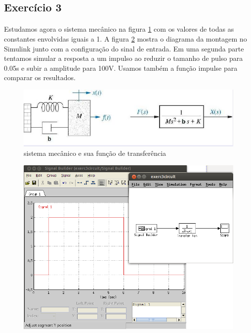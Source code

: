 \documentclass[a4paper,11pt]{article}
\begin{document}
\subsection{Exercício 3}
\paragraph{}Estudamos agora o sistema mecânico na figura
\ref{fig:exerc3-diagram} com os valores de todas as 
constantes envolvidas iguais a 1. A  figura \ref{fig:exerc3-matlab}
mostra o diagrama da montagem no Simulink junto com a configuração 
do sinal de entrada. Em uma segunda parte tentamos simular a resposta
a um impulso ao reduzir o tamanho de pulso para 0.05s e subir a amplitude
para 100V. Usamos também a função impulse para comparar os resultados.

\FloatBarrier
\begin{figure}[!htp]
		\centering
		\includegraphics[scale = 0.6]{./images/exp2-problem3.jpg}
	\caption{sistema mecânico e sua função de transferência}
	\label{fig:exerc3-diagram}
\end{figure}
\begin{figure}[!htp]
		\centering
		\includegraphics[scale = 0.6]{./images/exp2-circuit3-montagem.png}
	\caption{}
	\label{fig:exerc3-matlab}
\end{figure}
\end{document}
